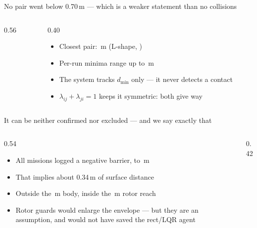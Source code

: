 \documentclass[aspectratio=169,11pt,t]{beamer}
\begin{document}
\begin{frame}{No pair went below 0.70\,m --- which is a weaker statement than no collisions}
  \label{q:v2v}
  \begin{columns}[T,onlytextwidth]
    \begin{column}{0.56\textwidth}
    \end{column}
    \begin{column}{0.40\textwidth}
      \vskip2mm
      \begin{itemize}\bulletgap\small
        \item Closest pair: \VtwovLshapeLqr\,m (L-shape, \lqr)
        \item Per-run minima range up to \VtwovUshapeHinf\,m
        \item The system tracks $d_{\min}$ only --- it never detects a contact
        \item $\lambda_{ij}+\lambda_{ji}=1$ keeps it symmetric: both give way
      \end{itemize}
    \end{column}
  \end{columns}
\end{frame}

\begin{frame}{It can be neither confirmed nor excluded --- and we say exactly that}
  \label{q:hdyn}
  \begin{columns}[T,onlytextwidth]
    \begin{column}{0.54\textwidth}
      \begin{itemize}\bulletgap\small
        \item All \NRunsHdynNeg{} missions logged a negative barrier, to
              \HdynMinLogged\,m
        \item That implies about 0.34\,m of surface distance
        \item Outside the \BodyHalf\,m body, inside the \RotorReach\,m rotor reach
        \item Rotor guards would enlarge the envelope --- but they are an
              assumption, and would not have saved the rect/LQR agent
      \end{itemize}
    \end{column}
    \begin{column}{0.42\textwidth}\end{column}
  \end{columns}
\end{frame}
\end{document}

